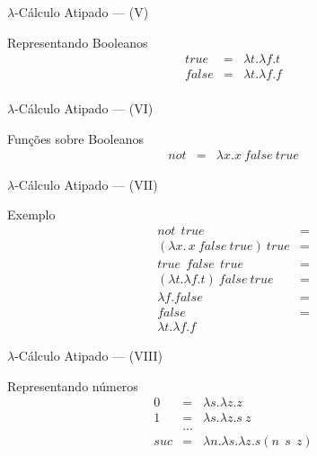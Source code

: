 \documentclass{beamer}
\begin{document}
   \begin{frame}{$\lambda$-Cálculo Atipado --- (V)}
      \begin{block}{Representando Booleanos}
         \[
             \begin{array}{lcl}
                true & = & \lambda t. \lambda f. t\\
                false & = & \lambda t. \lambda f. f\\
             \end{array}
         \]
      \end{block}
   \end{frame}
   \begin{frame}{$\lambda$-Cálculo Atipado --- (VI)}
      \begin{block}{Funções sobre Booleanos}
         \[
             \begin{array}{lcl}
                not & = & \lambda x . x\: false\: true
             \end{array}
         \]
      \end{block}
   \end{frame}
   \begin{frame}{$\lambda$-Cálculo Atipado --- (VII)}
      \begin{block}{Exemplo}
         \[
             \begin{array}{lc}
                not\:\: true & = \\
                (\lambda x .\, x\: false\: true)\: true & = \\
                true\:\: false\:\: true & = \\
                (\lambda t. \lambda f. t)\: false\: true & = \\
                \lambda f. false & = \\
                false & = \\
                \lambda t. \lambda f. f
             \end{array}
         \]
      \end{block}
   \end{frame}
   \begin{frame}{$\lambda$-Cálculo Atipado --- (VIII)}
      \begin{block}{Representando números}
         \[
             \begin{array}{lcl}
                0 & = & \lambda s. \lambda z. z \\
                1 & = & \lambda s. \lambda z. s\: z \\
                  & ... & \\
                suc & = & \lambda n. \lambda s. \lambda z. s (n\:\:s\:\:z)
             \end{array}
         \]
      \end{block}
   \end{frame}
\end{document}
